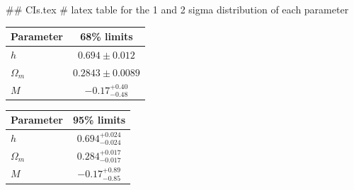 ## CIs.tex
# latex table for the 1 and 2 sigma distribution of each parameter

\begin{tabular} { l  c}
 Parameter &  68\% limits\\
\hline
{\boldmath$h              $} & $0.694\pm 0.012            $\\
{\boldmath$\Omega_m       $} & $0.2843\pm 0.0089          $\\
{\boldmath$M              $} & $-0.17^{+0.40}_{-0.48}     $\\
\hline
\end{tabular}

\begin{tabular} { l  c}
 Parameter &  95\% limits\\
\hline
{\boldmath$h              $} & $0.694^{+0.024}_{-0.024}   $\\
{\boldmath$\Omega_m       $} & $0.284^{+0.017}_{-0.017}   $\\
{\boldmath$M              $} & $-0.17^{+0.89}_{-0.85}     $\\
\hline
\end{tabular}
